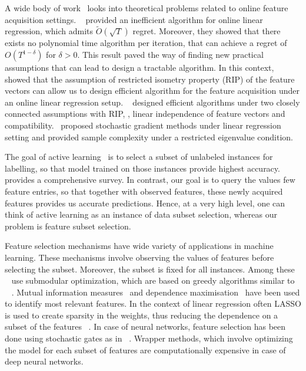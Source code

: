 \documentclass[letterpaper]{article}
\renewcommand{\cite}{\citep}
\begin{document}
  A wide body of work~\cite{foster2016online,kale2017adaptive,ito2017efficient,murata2018sample} looks into theoretical problems related to online feature acquisition settings.
~\citet{foster2016online} provided an inefficient algorithm for online linear regression, which admits $\tilde{O}(\sqrt{T})$ regret. Moreover, they 
showed that there exists no polynomial time algorithm per iteration, that can achieve a regret of $O(T^{1-\delta})$ for $\delta>0$.  This result 
paved the way of finding new practical assumptions that can lead to design a tractable algorithm.
In this context,~\citet{kale2017adaptive} showed that the assumption of restricted isometry property (RIP) of the feature vectors 
can allow us to design efficient algorithm for the feature acquisition under an online linear regression setup.
~\citet{ito2017efficient} designed efficient algorithms under two closely connected assumptions with RIP, \viz,
linear independence of feature vectors and compatibility.~\citet{murata2018sample}
proposed stochastic gradient methods under linear regression setting and provided sample complexity under a restricted eigenvalue condition.

 The goal of active learning~\cite{active1,active2,active3,active4,active5,active6,active7} is to select a subset of unlabeled instances for labelling, so that model trained on those instances provide highest accuracy.~\citet{activeSurvey} provides a comprehensive survey.
In contrast, our goal is to query the values few feature entries, so that together with observed features, these newly acquired features provides us accurate predictions.
Hence, at a very high level, one can think of active learning as an instance of data subset selection, whereas our problem is feature subset selection.


 Feature selection mechanisms have wide variety of applications in machine learning. These mechanisms involve observing the values of features before selecting the subset. Moreover, the subset is fixed for all instances. Among these ~\cite{khanna2017scalable,killamsetty2021grad,harshaw2019submodular,das2018approximate} use submodular optimization, which are based on greedy algorithms similar to ~\cite{elenberg2018restricted,mirzasoleiman2015lazier} . Mutual information measures~\cite{estevez2009normalized} and dependence maximisation~\cite{song2012feature} have been used to identify most relevant features. In the context of linear regression often LASSO is used to create sparsity in the weights, thus reducing the dependence on a subset of the features~\cite{hans2009bayesian} . In case of neural networks, feature selection has been done using stochastic gates as in~\cite{yamada2020feature} . Wrapper methods, which involve optimizing the model for each subset of features are computationally expensive in case of deep neural networks.
\end{document}
